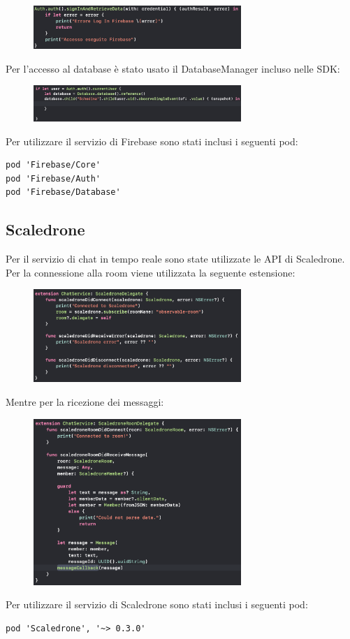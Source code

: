 \documentclass[numbers=noenddot, 12pt, a4paper, oneside]{scrbook}
\begin{document}
\begin{figure}[H]
	\centering
	\includegraphics[width=0.7\textwidth]{images/LoginFirebase}
\end{figure}
Per l'accesso al database è stato usato il DatabaseManager incluso nelle SDK:
\begin{figure}[H]
	\centering
	\includegraphics[width=0.7\textwidth]{images/DBaccess}
\end{figure}
Per utilizzare il servizio di Firebase sono stati inclusi i seguenti pod:
\begin{lstlisting}[style=CStyle]
pod 'Firebase/Core'
pod 'Firebase/Auth'
pod 'Firebase/Database'
\end{lstlisting}

\subsection*{Scaledrone}
Per il servizio di chat in tempo reale sono state utilizzate le API di Scaledrone. Per la connessione alla room viene utilizzata la seguente estensione:
\begin{figure}[H]
	\centering
	\includegraphics[width=0.7\textwidth]{images/ScaledroneConnect}
\end{figure}
Mentre per la ricezione dei messaggi:
\begin{figure}[H]
	\centering
	\includegraphics[width=0.7\textwidth]{images/ScaledroneReceive}
\end{figure}
Per utilizzare il servizio di Scaledrone sono stati inclusi i seguenti pod:
\begin{lstlisting}[style=CStyle]
pod 'Scaledrone', '~> 0.3.0'
\end{lstlisting}
\end{document}
